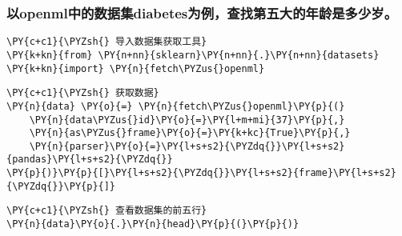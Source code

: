     \hypertarget{ux4ee5openmlux4e2dux7684ux6570ux636eux96c6diabetesux4e3aux4f8bux67e5ux627eux7b2cux4e94ux5927ux7684ux5e74ux9f84ux662fux591aux5c11ux5c81}{%
\subsubsection{以openml中的数据集diabetes为例，查找第五大的年龄是多少岁。}\label{ux4ee5openmlux4e2dux7684ux6570ux636eux96c6diabetesux4e3aux4f8bux67e5ux627eux7b2cux4e94ux5927ux7684ux5e74ux9f84ux662fux591aux5c11ux5c81}}

    \begin{tcolorbox}[breakable, size=fbox, boxrule=1pt, pad at break*=1mm,colback=cellbackground, colframe=cellborder]
\begin{Verbatim}[commandchars=\\\{\}]
\PY{c+c1}{\PYZsh{} 导入数据集获取工具}
\PY{k+kn}{from} \PY{n+nn}{sklearn}\PY{n+nn}{.}\PY{n+nn}{datasets} \PY{k+kn}{import} \PY{n}{fetch\PYZus{}openml}
\end{Verbatim}
\end{tcolorbox}

    \begin{tcolorbox}[breakable, size=fbox, boxrule=1pt, pad at break*=1mm,colback=cellbackground, colframe=cellborder]
\begin{Verbatim}[commandchars=\\\{\}]
\PY{c+c1}{\PYZsh{} 获取数据}
\PY{n}{data} \PY{o}{=} \PY{n}{fetch\PYZus{}openml}\PY{p}{(}
    \PY{n}{data\PYZus{}id}\PY{o}{=}\PY{l+m+mi}{37}\PY{p}{,}
    \PY{n}{as\PYZus{}frame}\PY{o}{=}\PY{k+kc}{True}\PY{p}{,}
    \PY{n}{parser}\PY{o}{=}\PY{l+s+s2}{\PYZdq{}}\PY{l+s+s2}{pandas}\PY{l+s+s2}{\PYZdq{}}
\PY{p}{)}\PY{p}{[}\PY{l+s+s2}{\PYZdq{}}\PY{l+s+s2}{frame}\PY{l+s+s2}{\PYZdq{}}\PY{p}{]}
\end{Verbatim}
\end{tcolorbox}

    \begin{tcolorbox}[breakable, size=fbox, boxrule=1pt, pad at break*=1mm,colback=cellbackground, colframe=cellborder]
\begin{Verbatim}[commandchars=\\\{\}]
\PY{c+c1}{\PYZsh{} 查看数据集的前五行}
\PY{n}{data}\PY{o}{.}\PY{n}{head}\PY{p}{(}\PY{p}{)}
\end{Verbatim}
\end{tcolorbox}

